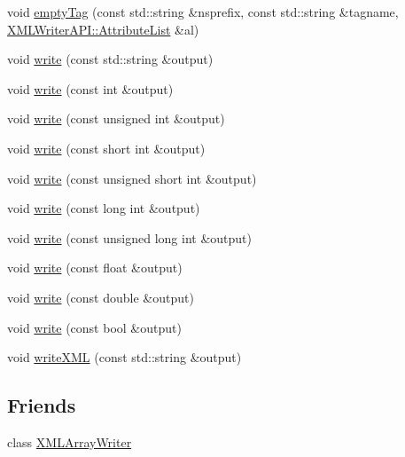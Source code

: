 \begin{DoxyCompactItemize}
\item 
void \mbox{\hyperlink{classADATXML_1_1XMLWriter_a7b356346477d6f2e8e2d2db7553147dc}{empty\+Tag}} (const std\+::string \&nsprefix, const std\+::string \&tagname, \mbox{\hyperlink{namespaceXMLWriterAPI_a28cf3d8051a4ccf0aef208b7ebc66d07}{X\+M\+L\+Writer\+A\+P\+I\+::\+Attribute\+List}} \&al)
\item 
void \mbox{\hyperlink{classADATXML_1_1XMLWriter_a82f1a99241ecd26ea2bd7f3d87364ed7}{write}} (const std\+::string \&output)
\item 
void \mbox{\hyperlink{classADATXML_1_1XMLWriter_aa027c8bf616bdc96982bb11a2610469e}{write}} (const int \&output)
\item 
void \mbox{\hyperlink{classADATXML_1_1XMLWriter_a36ebb7ce3a0fde310c457c9520ca961e}{write}} (const unsigned int \&output)
\item 
void \mbox{\hyperlink{classADATXML_1_1XMLWriter_ab29dc20acb63a2ac633b35cc03e6e58f}{write}} (const short int \&output)
\item 
void \mbox{\hyperlink{classADATXML_1_1XMLWriter_a07c953442846b4d1f2d34b00a9371626}{write}} (const unsigned short int \&output)
\item 
void \mbox{\hyperlink{classADATXML_1_1XMLWriter_a39b29ce03b5b71ef853e1952d1899d73}{write}} (const long int \&output)
\item 
void \mbox{\hyperlink{classADATXML_1_1XMLWriter_a5536c007036f96cc720f38199c3ee6a3}{write}} (const unsigned long int \&output)
\item 
void \mbox{\hyperlink{classADATXML_1_1XMLWriter_adafcb9ed0bb0a4de7a590d877ada4d6f}{write}} (const float \&output)
\item 
void \mbox{\hyperlink{classADATXML_1_1XMLWriter_a54aeec25255feb2aa7063885ca48aa7e}{write}} (const double \&output)
\item 
void \mbox{\hyperlink{classADATXML_1_1XMLWriter_af2cc624cb1450f5b6f430573b626e73e}{write}} (const bool \&output)
\item 
void \mbox{\hyperlink{classADATXML_1_1XMLWriter_a887415a6f26bde42e76af7d831087c7e}{write\+X\+ML}} (const std\+::string \&output)
\end{DoxyCompactItemize}
\subsection*{Friends}
\begin{DoxyCompactItemize}
\item 
class \mbox{\hyperlink{classADATXML_1_1XMLWriter_a5aadf941042ceaf969503029ae4f005b}{X\+M\+L\+Array\+Writer}}
\end{DoxyCompactItemize}
